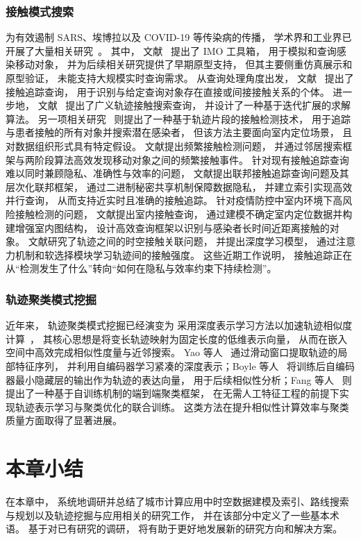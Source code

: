 \subsubsection*{接触模式搜索}
为有效遏制 SARS、埃博拉以及 COVID-19 等传染病的传播， 学术界和工业界已开展了大量相关研究~。 其中， 文献~ 提出了 IMO 工具箱， 用于模拟和查询感染移动对象， 并为后续相关研究提供了早期原型支持， 但其主要侧重仿真展示和原型验证， 未能支持大规模实时查询需求。 从查询处理角度出发， 文献~ 提出了接触追踪查询， 用于识别与给定查询对象存在直接或间接接触关系的个体。 进一步地， 文献~ 提出了广义轨迹接触搜索查询， 并设计了一种基于迭代扩展的求解算法。 另一项相关研究~ 则提出了一种基于轨迹片段的接触检测技术， 用于追踪与患者接触的所有对象并搜索潜在感染者， 但该方法主要面向室内定位场景， 且对数据组织形式具有特定假设。 文献提出频繁接触检测问题， 并通过邻居搜索框架与两阶段算法高效发现移动对象之间的频繁接触事件。 针对现有接触追踪查询难以同时兼顾隐私、准确性与效率的问题， 文献提出联邦接触追踪查询问题及其层次化联邦框架， 通过二进制秘密共享机制保障数据隐私， 并建立索引实现高效并行查询， 从而支持近实时且准确的接触追踪。 针对疫情防控中室内环境下高风险接触检测的问题， 文献提出室内接触查询， 通过建模不确定室内定位数据并构建增强室内图结构， 设计高效查询框架以识别与感染者长时间近距离接触的对象。 文献研究了轨迹之间的时空接触关联问题， 并提出深度学习模型， 通过注意力机制和软选择模块学习轨迹间的接触强度。 这些近期工作说明， 接触追踪正在从“检测发生了什么”转向“如何在隐私与效率约束下持续检测”。



\subsubsection*{轨迹聚类模式挖掘}
近年来， 轨迹聚类模式挖掘已经演变为 采用深度表示学习方法以加速轨迹相似度计算~， 其核心思想是将变长轨迹映射为固定长度的低维表示向量， 从而在嵌入空间中高效完成相似性度量与近邻搜索。 Yao 等人~ 通过滑动窗口提取轨迹的局部特征序列， 并利用自编码器学习紧凑的深度表示；Boyle 等人~ 将训练后自编码器最小隐藏层的输出作为轨迹的表达向量， 用于后续相似性分析；Fang 等人~ 则提出了一种基于自训练机制的端到端聚类框架， 在无需人工特征工程的前提下实现轨迹表示学习与聚类优化的联合训练。 这类方法在提升相似性计算效率与聚类质量方面取得了显著进展。





\section{本章小结}

在本章中， 系统地调研并总结了城市计算应用中时空数据建模及索引、路线搜索与规划以及轨迹挖掘与应用相关的研究工作， 并在该部分中定义了一些基本术语。 基于对已有研究的调研， 将有助于更好地发展新的研究方向和解决方案。

